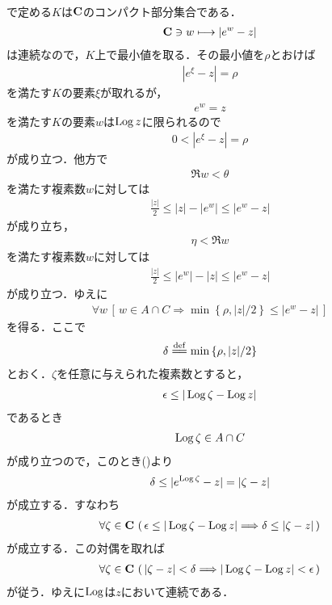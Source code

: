 \begin{sketch}
\begin{description}
\begin{align}
				\end{align}
				で定める$K$は$\mathbf{C}$のコンパクト部分集合である．
				\begin{align}
					\mathbf{C} \ni w \longmapsto |e^{w} - z|
				\end{align}
				は連続なので，$K$上で最小値を取る．その最小値を$\rho$とおけば
				\begin{align}
					|e^{\xi} - z| = \rho
				\end{align}
				を満たす$K$の要素$\xi$が取れるが，
				\begin{align}
					e^{w} = z
				\end{align}
				を満たす$K$の要素$w$は$\operatorname{Log}{z}$に限られるので
				\begin{align}
					0 < |e^{\xi} - z| = \rho
				\end{align}
				が成り立つ．他方で
				\begin{align}
					\Re{w} < \theta
				\end{align}
				を満たす複素数$w$に対しては
				\begin{align}
					\frac{|z|}{2} \leq |z| - |e^{w}| \leq |e^{w} - z|
				\end{align}
				が成り立ち，
				\begin{align}
					\eta < \Re{w}
				\end{align}
				を満たす複素数$w$に対しては
				\begin{align}
					\frac{|z|}{2} \leq |e^{w}| - |z| \leq |e^{w} - z|
				\end{align}
				が成り立つ．ゆえに
				\begin{align}
					\forall w\,
					\left[\, w \in A \cap C \Longrightarrow 
					\min\left\{\rho,|z|/2\right\} \leq |e^{w} - z|\, \right]
					\label{fom:thm_pv_log_is_holomorphic}
				\end{align}
				を得る．ここで
				\begin{align}
					\delta \defeq \min\left\{\rho,|z|/2\right\}
				\end{align}
				とおく．$\zeta$を任意に与えられた複素数とすると，
				\begin{align}
					\epsilon \leq |\operatorname{Log}{\zeta} - \operatorname{Log}{z}|
				\end{align}
				であるとき
				\begin{align}
					\operatorname{Log}{\zeta} \in A \cap C
				\end{align}
				が成り立つので，このとき()より
				\begin{align}
					\delta \leq |e^{\operatorname{Log}{\zeta}} - z| = |\zeta - z|
				\end{align}
				が成立する．すなわち
				\begin{align}
					\forall \zeta \in \mathbf{C}\, \left(\,
					\epsilon \leq |\operatorname{Log}{\zeta} - \operatorname{Log}{z}| 
					\Longrightarrow \delta \leq |\zeta - z|\, \right)
				\end{align}
				が成立する．この対偶を取れば
				\begin{align}
					\forall \zeta \in \mathbf{C}\, \left(\,
					|\zeta - z| < \delta \Longrightarrow |\operatorname{Log}{\zeta} - \operatorname{Log}{z}| < \epsilon\, \right)
				\end{align}
				が従う．ゆえに$\operatorname{Log}$は$z$において連続である．
				

\end{description}
\end{sketch}
